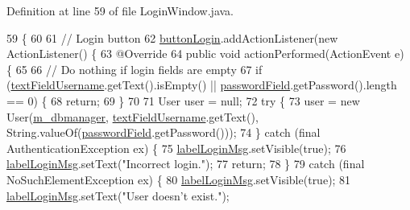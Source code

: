 Definition at line 59 of file Login\+Window.\+java.


\begin{DoxyCode}
59                                         \{
60 
61         \textcolor{comment}{// Login button}
62         \mbox{\hyperlink{classcom_1_1activitytracker_1_1_login_window_ac77d9f8f3a6c697a9847ecd130ac2ef6}{buttonLogin}}.addActionListener(\textcolor{keyword}{new} ActionListener() \{
63             @Override
64             \textcolor{keyword}{public} \textcolor{keywordtype}{void} actionPerformed(ActionEvent e) \{
65 
66                 \textcolor{comment}{// Do nothing if login fields are empty}
67                 \textcolor{keywordflow}{if} (\mbox{\hyperlink{classcom_1_1activitytracker_1_1_login_window_aba181dcec114c349a67304406bcce92a}{textFieldUsername}}.getText().isEmpty() || 
      \mbox{\hyperlink{classcom_1_1activitytracker_1_1_login_window_ae53353ceea197fe7b93f1b7156112d08}{passwordField}}.getPassword().length == 0) \{
68                     \textcolor{keywordflow}{return};
69                 \}
70 
71                 User user = null;
72                 \textcolor{keywordflow}{try} \{
73                     user = \textcolor{keyword}{new} User(\mbox{\hyperlink{classcom_1_1activitytracker_1_1_login_window_a1d278c8158f803151737943e9ea2a9bf}{m\_dbmanager}}, \mbox{\hyperlink{classcom_1_1activitytracker_1_1_login_window_aba181dcec114c349a67304406bcce92a}{textFieldUsername}}.getText(), 
      String.valueOf(\mbox{\hyperlink{classcom_1_1activitytracker_1_1_login_window_ae53353ceea197fe7b93f1b7156112d08}{passwordField}}.getPassword()));
74                 \} \textcolor{keywordflow}{catch} (\textcolor{keyword}{final} AuthenticationException ex) \{
75                     \mbox{\hyperlink{classcom_1_1activitytracker_1_1_login_window_a567ae49b39c07840b39eec92fdf92c22}{labelLoginMsg}}.setVisible(\textcolor{keyword}{true});
76                     \mbox{\hyperlink{classcom_1_1activitytracker_1_1_login_window_a567ae49b39c07840b39eec92fdf92c22}{labelLoginMsg}}.setText(\textcolor{stringliteral}{"Incorrect login."});
77                     \textcolor{keywordflow}{return};
78                 \}
79                 \textcolor{keywordflow}{catch} (\textcolor{keyword}{final} NoSuchElementException ex) \{
80                     \mbox{\hyperlink{classcom_1_1activitytracker_1_1_login_window_a567ae49b39c07840b39eec92fdf92c22}{labelLoginMsg}}.setVisible(\textcolor{keyword}{true});
81                     \mbox{\hyperlink{classcom_1_1activitytracker_1_1_login_window_a567ae49b39c07840b39eec92fdf92c22}{labelLoginMsg}}.setText(\textcolor{stringliteral}{"User doesn't exist."});

\end{DoxyCode}

